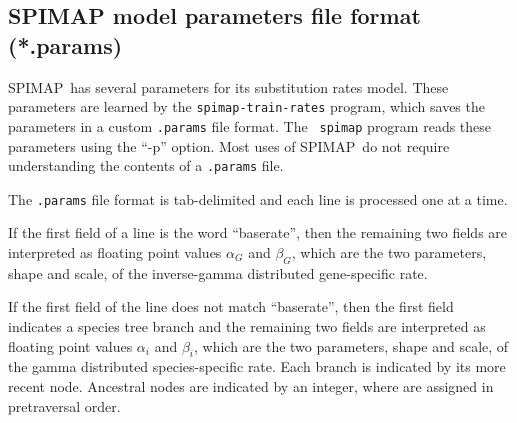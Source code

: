 \documentclass[11pt]{article}
\newcommand{\spimap}{{\sf\scshape SPIMAP}}
\begin{document}
\subsection{SPIMAP model parameters file format (*.params)}
\label{sec:file:params}

\spimap\ has several parameters for its substitution rates model.  These
parameters are learned by the {\tt spimap-train-rates} program, which
saves the parameters in a custom {\tt *.params} file format.  The {\tt 
spimap} program reads these parameters using the ``-p'' option.
Most uses of \spimap\ do not require understanding the contents of
a {\tt *.params} file.

The {\tt *.params} file format is tab-delimited and each line is
processed one at a time.

If the first field of a line is the word ``baserate'', then the
remaining two fields are interpreted as floating point values
$\alpha_G$ and $\beta_G$, which are the two parameters, shape and
scale, of the inverse-gamma distributed gene-specific rate.

If the first field of the line does not match ``baserate'', then the first
field indicates a species tree branch and the remaining two fields
are interpreted as floating point values $\alpha_i$ and $\beta_i$,
which are the two parameters, shape and scale, of the gamma distributed
species-specific rate.  Each branch is indicated by its more recent node.
Ancestral nodes are indicated by an integer, where are assigned in 
pretraversal order.
\end{document}
